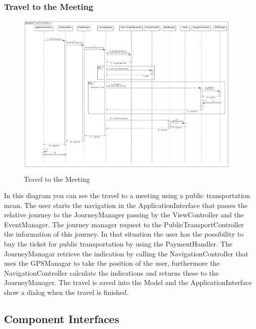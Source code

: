 \subsubsection{Travel to the Meeting}
\begin{figure}[H]
\centering
\includegraphics[scale=0.25]{images/TravelToTheMeeting}
\caption{Travel to the Meeting}
\end{figure}In this diagram you can see the travel to a meeting using a public transportation mean. The user starts the navigation in the ApplicationInterface that passes the relative journey to the JourneyManager passing by the ViewController and the EventManager. The journey manager request to the PublicTransportController the information of this journey. In that situation the user has the possibility to buy the ticket for public transportation by using the PaymentHandler. The JourneyManagar retrieve the indication by calling the NavigationController that uses the GPSManagar to take the position of the user, furthermore the NavigationController calculate the indications and returns these to the JourneyManager. The travel is saved into the Model and the ApplicationInterface show a dialog when the travel is finished.

\clearpage
\subsection{Component Interfaces}

\clearpage
